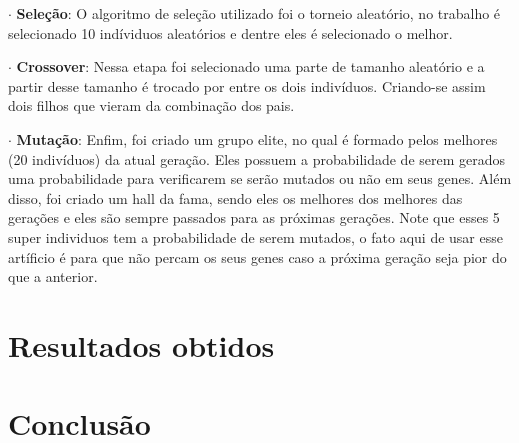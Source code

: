 \documentclass[article, a4paper, 12pt]{article}
\begin{document}
$\cdot$ \textbf{Seleção}: O algoritmo de seleção utilizado foi o torneio aleatório, no trabalho é selecionado 10 indíviduos aleatórios e dentre eles é selecionado o melhor.

$\cdot$ \textbf{Crossover}: Nessa etapa foi selecionado uma parte de tamanho aleatório e a partir desse tamanho é trocado por entre os dois indivíduos. Criando-se assim dois filhos que vieram da combinação dos pais.

$\cdot$ \textbf{Mutação}: Enfim, foi criado um grupo elite, no qual é formado pelos melhores (20 indivíduos) da atual geração. Eles possuem a probabilidade de serem gerados uma probabilidade para verificarem se serão mutados ou não em seus genes. Além disso, foi criado um hall da fama, sendo eles os melhores dos melhores das gerações e eles são sempre passados para as próximas gerações. Note que esses 5 super individuos tem a probabilidade de serem mutados, o fato aqui de usar esse artíficio é para que não percam os seus genes caso a próxima geração seja pior do que a anterior.

\section{Resultados obtidos}

\section{Conclusão}
\end{document}
